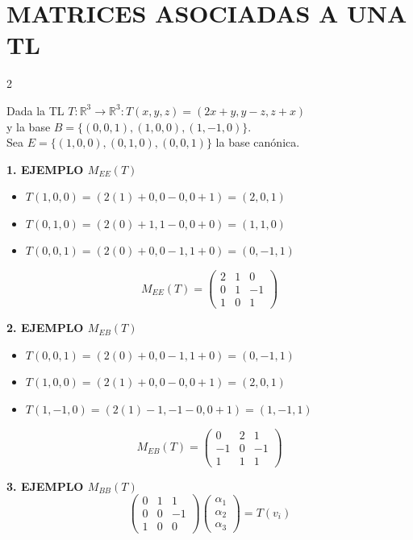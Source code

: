 \documentclass[10pt]{extarticle}
\newenvironment{term}
  {\begin{minipage}{\linewidth}}
  {\end{minipage}\par}
\begin{document}
\section*{MATRICES ASOCIADAS A UNA TL}
\begin{multicols}{2}

Dada la TL $T: \mathbb{R}^3 \to \mathbb{R}^3 : T(x,y,z) = (2x+y, y-z, z+x)$ \\
y la base $B = \{(0,0,1), (1,0,0), (1,-1,0)\}$. \\
Sea $E = \{(1,0,0), (0,1,0), (0,0,1)\}$ la base canónica.

\textbf{1. EJEMPLO $M_{EE}(T)$}
\begin{itemize}[leftmargin=1.2em]
\item $T(1,0,0) = (2(1)+0, 0-0, 0+1) = (2, 0, 1)$
\item $T(0,1,0) = (2(0)+1, 1-0, 0+0) = (1, 1, 0)$
\item $T(0,0,1) = (2(0)+0, 0-1, 1+0) = (0, -1, 1)$
\end{itemize}

$$M_{EE}(T) = \begin{pmatrix} 2 & 1 & 0 \\ 0 & 1 & -1 \\ 1 & 0 & 1 \end{pmatrix}$$

\begin{term}
\textbf{2. EJEMPLO $M_{EB}(T)$}
\begin{itemize}[leftmargin=1.2em]
\item $T(0,0,1) = (2(0)+0, 0-1, 1+0) = (0, -1, 1)$
\item $T(1,0,0) = (2(1)+0, 0-0, 0+1) = (2, 0, 1)$
\item $T(1,-1,0) = (2(1)-1, -1-0, 0+1) = (1, -1, 1)$
\end{itemize}

$$M_{EB}(T) = \begin{pmatrix} 0 & 2 & 1 \\ -1 & 0 & -1 \\ 1 & 1 & 1 \end{pmatrix}$$
\end{term}

\begin{term}
\textbf{3. EJEMPLO $M_{BB}(T)$}
$$\begin{pmatrix} 0 & 1 & 1 \\ 0 & 0 & -1 \\ 1 & 0 & 0 \end{pmatrix} \begin{pmatrix} \alpha_1 \\ \alpha_2 \\ \alpha_3 \end{pmatrix} = T(v_i)$$


\end{term}
\end{multicols}
\end{document}
